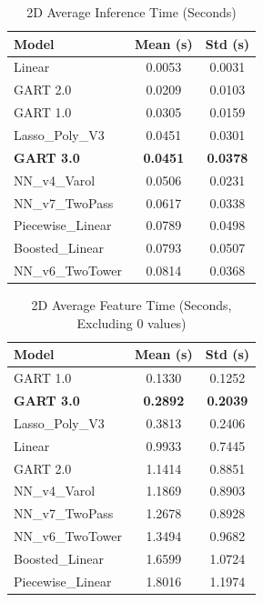 \documentclass[11pt, a4paper]{article}
\begin{document}
\begin{table}[H]
    \centering
    \caption{2D Average Inference Time (Seconds)}
    \label{tab:2d_inf_time}
    \begin{tabular}{lS[table-format=1.4]S[table-format=1.4]}
        \toprule
        \textbf{Model} & {\textbf{Mean (s)}} & {\textbf{Std (s)}} \\
        \midrule
        Linear & 0.0053 & 0.0031 \\
        GART 2.0 & 0.0209 & 0.0103 \\
        GART 1.0 & 0.0305 & 0.0159 \\
        Lasso\_Poly\_V3 & 0.0451 & 0.0301 \\
        \textbf{GART 3.0} & \textbf{0.0451} & \textbf{0.0378} \\
        NN\_v4\_Varol & 0.0506 & 0.0231 \\
        NN\_v7\_TwoPass & 0.0617 & 0.0338 \\
        Piecewise\_Linear & 0.0789 & 0.0498 \\
        Boosted\_Linear & 0.0793 & 0.0507 \\
        NN\_v6\_TwoTower & 0.0814 & 0.0368 \\
        \bottomrule
    \end{tabular}
\end{table}

\begin{table}[H]
    \centering
    \caption{2D Average Feature Time (Seconds, Excluding 0 values)}
    \label{tab:2d_feature_time}
    \begin{tabular}{lS[table-format=1.4]S[table-format=1.4]}
        \toprule
        \textbf{Model} & {\textbf{Mean (s)}} & {\textbf{Std (s)}} \\
        \midrule
        GART 1.0 & 0.1330 & 0.1252 \\
        \textbf{GART 3.0} & \textbf{0.2892} & \textbf{0.2039} \\
        Lasso\_Poly\_V3 & 0.3813 & 0.2406 \\
        Linear & 0.9933 & 0.7445 \\
        GART 2.0 & 1.1414 & 0.8851 \\
        NN\_v4\_Varol & 1.1869 & 0.8903 \\
        NN\_v7\_TwoPass & 1.2678 & 0.8928 \\
        NN\_v6\_TwoTower & 1.3494 & 0.9682 \\
        Boosted\_Linear & 1.6599 & 1.0724 \\
        Piecewise\_Linear & 1.8016 & 1.1974 \\
        \bottomrule
    \end{tabular}
\end{table}
\end{document}
